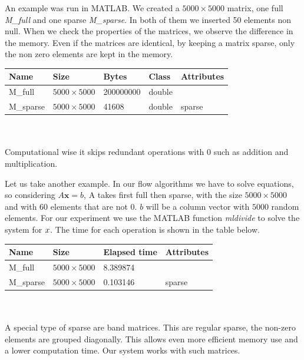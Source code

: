 \documentclass[12pt,a4paper,twoside]{report}
\begin{document}
{An example was run in MATLAB. We created a  $5000\times5000$ matrix, one full\textit{ M\_full }and one sparse \textit{M\_sparse}. In both of them we inserted 50 elements non null. When we check the properties of the matrices, we observe the difference in the memory.
Even if the matrices are identical, by keeping a matrix sparse, only the non zero elements are kept in the memory. 
\\

\begin{tabular}{ l l l l l }
	\hline
		Name  &           Size  &                Bytes & Class   &  Attributes \\
	\hline
M\_full    &    $5000\times5000$      &      200000000 & double  &            \\
M\_sparse  &    $5000\times5000$       &         41608  & double &   sparse    

\end{tabular}
\\
\\


Computational wise it skips redundant operations with 0 such as addition and multiplication.

Let us take another example. In our flow algorithms we have to solve equations, so considering $A\boldsymbol{x} = b$, A takes first full then sparse, with the size $5000\times5000$ and with 60 elements that are not $0$. $b$ will be a column vector with $5000$ random elements. For our experiment we use the MATLAB function \textit{mldivide} to solve the system for $\boldmath{x}$. The time for each operation is shown in the table below.
\\

\begin{tabular}{ l l  l l }
	\hline
	Name  &           Size  &                Elapsed time   &  Attributes \\
	\hline
	M\_full    &    $5000\times5000$      &      8.389874   &            \\
	M\_sparse  &    $5000\times5000$       &         0.103146   &   sparse    
	
\end{tabular}
\\
\\

A special type of sparse are band matrices. This are regular sparse, the non-zero elements are grouped diagonally. This allows even more efficient memory use and a lower computation time.  Our system works with such matrices. 

}
\end{document}
